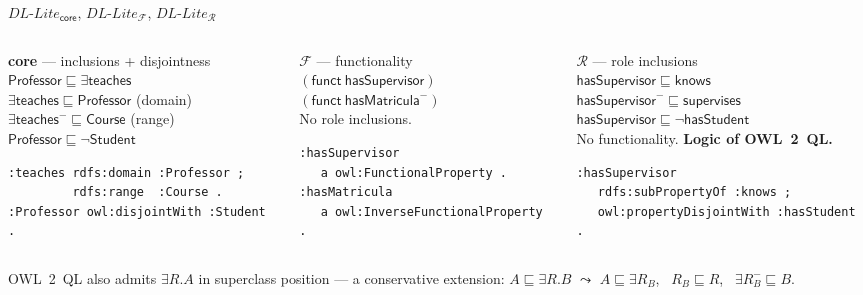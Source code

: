\documentclass[10pt,aspectratio=169,xcolor=table]{beamer}
\newcommand{\dllite}[1]{\ensuremath{\textit{DL-Lite}_{#1}}}
\newcommand{\cn}[1]{\mathsf{#1}}
\newcommand{\rn}[1]{\mathsf{#1}}
\newcommand{\sub}{\sqsubseteq}
\newcommand{\inv}[1]{#1^{-}}
\newcommand{\hl}[1]{\textcolor{accent}{\textbf{#1}}}
\begin{document}
\begin{frame}[fragile]{$\dllite{\mathsf{core}}$, $\dllite{\mathcal{F}}$, $\dllite{\mathcal{R}}$}
  \begin{columns}[T]
    \begin{column}{0.33\textwidth}
      \textbf{core} --- inclusions + disjointness\\[2pt]
      \scriptsize
      $\cn{Professor} \sub \exists \rn{teaches}$\\
      $\exists \rn{teaches} \sub \cn{Professor}$ \hfill (domain)\\
      $\exists \inv{\rn{teaches}} \sub \cn{Course}$ \hfill (range)\\
      $\cn{Professor} \sub \neg\cn{Student}$
\begin{lstlisting}
:teaches rdfs:domain :Professor ;
         rdfs:range  :Course .
:Professor owl:disjointWith :Student .
\end{lstlisting}
    \end{column}
    \begin{column}{0.31\textwidth}
      \textbf{$\mathcal{F}$} --- functionality\\[2pt]
      \scriptsize
      $(\mathsf{funct}\ \rn{hasSupervisor})$\\
      $(\mathsf{funct}\ \inv{\rn{hasMatricula}})$\\
      No role inclusions.
\begin{lstlisting}
:hasSupervisor
   a owl:FunctionalProperty .
:hasMatricula
   a owl:InverseFunctionalProperty .
\end{lstlisting}
    \end{column}
    \begin{column}{0.33\textwidth}
      \textbf{$\mathcal{R}$} --- role inclusions\\[2pt]
      \scriptsize
      $\rn{hasSupervisor} \sub \rn{knows}$\\
      $\inv{\rn{hasSupervisor}} \sub \rn{supervises}$\\
      $\rn{hasSupervisor} \sub \neg\rn{hasStudent}$\\
      No functionality. \hl{Logic of OWL~2~QL.}
\begin{lstlisting}
:hasSupervisor
   rdfs:subPropertyOf :knows ;
   owl:propertyDisjointWith :hasStudent .
\end{lstlisting}
    \end{column}
  \end{columns}
  \vspace{0.6em}
  \footnotesize
  OWL~2~QL also admits $\exists R.A$ in superclass position --- a conservative extension:
  $A \sub \exists R.B$ \;$\leadsto$\; $A \sub \exists R_B$, \ $R_B \sub R$, \ $\exists \inv{R_B} \sub B$.
\end{frame}
\end{document}
